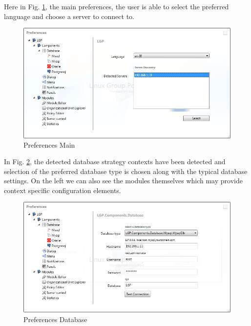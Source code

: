 	\newpage

	\normalsize
	{
		Here in Fig. \ref{fig:SSLanguageAndServer}, the main preferences, the user is able to select the preferred language 
		and choose a server to connect to.
		\newline			
	}
				
	\begin{figure}[h!]
		\centering
		\includegraphics[scale=0.75]{pages/appendix3/figures/lgpscreens/prefs-main.png}
		\caption{Preferences Main}
		\label{fig:SSLanguageAndServer}
	\end{figure}
		
	\normalsize
	{
		In Fig. \ref{fig:SSDb}, the detected database strategy contexts have been detected and selection of the 
		preferred database type is chosen along with the typical database settings.  On the left we can also see the modules themselves
		which may provide context specific configuration elements.
		\newline			
	}		

	\begin{figure}[h!]
		\centering
		\includegraphics[scale=0.75]{pages/appendix3/figures/lgpscreens/prefs-db.png}
		\caption{Preferences Database}
		\label{fig:SSDb}
	\end{figure}
	

